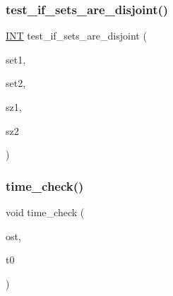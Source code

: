 \mbox{\label{util_8_c_a8a84459af36d4841d1aeb8657d2d3dea}} 
\subsubsection{\texorpdfstring{test\+\_\+if\+\_\+sets\+\_\+are\+\_\+disjoint()}{test\_if\_sets\_are\_disjoint()}}
{\footnotesize\ttfamily \mbox{\hyperlink{galois_8h_a09fddde158a3a20bd2dcadb609de11dc}{I\+NT}} test\+\_\+if\+\_\+sets\+\_\+are\+\_\+disjoint (\begin{DoxyParamCaption}\item[{\mbox{\hyperlink{galois_8h_a09fddde158a3a20bd2dcadb609de11dc}{I\+NT}} $\ast$}]{set1,  }\item[{\mbox{\hyperlink{galois_8h_a09fddde158a3a20bd2dcadb609de11dc}{I\+NT}} $\ast$}]{set2,  }\item[{\mbox{\hyperlink{galois_8h_a09fddde158a3a20bd2dcadb609de11dc}{I\+NT}}}]{sz1,  }\item[{\mbox{\hyperlink{galois_8h_a09fddde158a3a20bd2dcadb609de11dc}{I\+NT}}}]{sz2 }\end{DoxyParamCaption})}

\mbox{\label{util_8_c_a3e54f7e5a0326bf4b3de456ef318e9db}} 
\subsubsection{\texorpdfstring{time\+\_\+check()}{time\_check()}}
{\footnotesize\ttfamily void time\+\_\+check (\begin{DoxyParamCaption}\item[{ostream \&}]{ost,  }\item[{\mbox{\hyperlink{galois_8h_a09fddde158a3a20bd2dcadb609de11dc}{I\+NT}}}]{t0 }\end{DoxyParamCaption})}

\mbox{\label{util_8_c_aeb25eb3cbc89e1cd314f4a0fba55779b}} 

